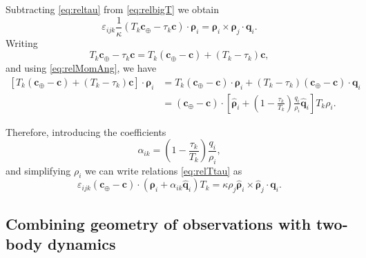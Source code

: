 \documentclass[11pt]{article}
\def\angmom{\bm{c}}
\def\angmom{{\bm{c}}}
\begin{document}
Subtracting \eqref{eq:reltau} from \eqref{eq:relbigT} we obtain
\begin{equation}
    \varepsilon_{ijk}\frac{1}{\kappa}(T_k\angmom_\oplus-\tau_k\angmom)\cdot\bm{\rho}_i = 
    \bm{\rho}_i\times\bm{\rho}_j \cdot\bm{q}_i.
    \label{eq:relTtau}
\end{equation}
Writing
\begin{equation*}
    T_k\bm{c}_\oplus- \tau_k\bm{c}
    = T_k\left(\bm{c}_\oplus-\bm{c}\right) +\left(T_k-\tau_k\right)\bm{c},
\end{equation*}
and using \eqref{eq:relMomAng}, we have
\begin{equation*}
    \begin{aligned}
    \left[T_k\left(\bm{c}_\oplus-\bm{c}\right)
      +\left(T_k-\tau_k\right)\bm{c}\right]\cdot\bm{\rho}_i &= 
    T_k\left(\bm{c}_\oplus-\bm{c}\right)\cdot\bm{\rho}_i
    +\left(T_k-\tau_k\right)\left(\bm{c}_\oplus-\bm{c}\right)\cdot\bm{q}_i \\
    &=  \left(\bm{c}_\oplus-\bm{c}\right)\cdot\left[\hat{\bm{\rho}}_i
      +\left(1-\frac{\tau_k}{T_k}\right)\frac{q_i}{\rho_i}\hat{\bm{q}}_i\right]T_k\rho_i.
    \end{aligned}
\end{equation*}

\noindent Therefore, introducing the coefficients
\begin{equation}
    \alpha_{ik} = \left(1-\frac{\tau_k}{T_k}\right)\frac{q_i}{\rho_i},
    \label{eq:alpha_def}
\end{equation}
and simplifying $\rho_i$ we can write relations \eqref{eq:relTtau} as
\begin{equation}
    \varepsilon_{ijk}\left(\bm{c}_\oplus-\bm{c}\right)\cdot
    \left(\hat{\bm{\rho}}_i+\alpha_{ik}\hat{\bm{q}}_i\right)T_k =
    \kappa\rho_j\hat{\bm{\rho}}_i\times\hat{\bm{\rho}}_j\cdot\bm{q}_i.
    \label{eq:relTtau_new}
\end{equation}


\subsection{Combining geometry of observations with two-body dynamics}
\end{document}
